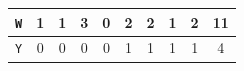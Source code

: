 \documentclass[submit]{ipsj}
\begin{document}
\begin{table}[t]
\begin{minipage}[t]{0.5\linewidth}
{\begin{tabular}{c|c|cccccccc}
\texttt{\large{W}}                   & 1                                           & \multicolumn{1}{c|}{1} & \multicolumn{1}{c|}{3} & \multicolumn{1}{c|}{0} & \multicolumn{1}{c|}{2} & \multicolumn{1}{c|}{2} & \multicolumn{1}{c|}{1} & \multicolumn{1}{c|}{2} & 11 \\ \hline
\texttt{\large{Y}}                   & 0                                           & \multicolumn{1}{c|}{0} & \multicolumn{1}{c|}{0} & \multicolumn{1}{c|}{0} & \multicolumn{1}{c|}{1} & \multicolumn{1}{c|}{1} & \multicolumn{1}{c|}{1} & \multicolumn{1}{c|}{1} & 4  \\ \hline
\end{tabular}
}
  \end{minipage}
  \vspace{-4mm}
\end{table}
\end{document}

